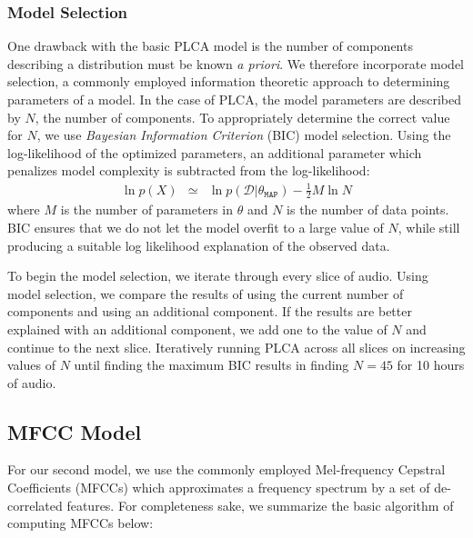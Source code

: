 \subsubsection{Model Selection}

One drawback with the basic PLCA model is the number of components describing a distribution must be known \textit{a priori}.  We therefore incorporate model selection, a commonly employed information theoretic approach to determining parameters of a model.  In the case of PLCA, the model parameters are described by $N$, the number of components.  To appropriately determine the correct value for $N$, we use \textit{Bayesian Information Criterion} (BIC) model selection.  Using the log-likelihood of the optimized parameters, an additional parameter which penalizes model complexity is subtracted from the log-likelihood:
\begin{eqnarray}
\ln{p(X)} &\simeq& \ln{p(\mathcal{D}|\theta_{\mathtt{MAP}})} - \frac{1}{2}M\ln{N}
\end{eqnarray}
where $M$ is the number of parameters in $\theta$ and $N$ is the number of data points.  BIC ensures that we do not let the model overfit to a large value of $N$, while still producing a suitable log likelihood explanation of the observed data.

To begin the model selection, we iterate through every slice of audio.  Using model selection, we compare the results of using the current number of components and using an additional component.  If the results are better explained with an additional component, we add one to the value of $N$ and continue to the next slice. Iteratively running PLCA across all slices on increasing values of $N$ until finding the maximum BIC results in finding $N=45$ for 10 hours of audio.  

\subsection{MFCC Model}
For our second model, we use the commonly employed Mel-frequency Cepstral Coefficients (MFCCs) which approximates a frequency spectrum by a set of de-correlated features.  For completeness sake, we summarize the basic algorithm of computing MFCCs below:

